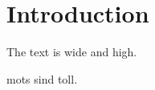 \chapter{Introduction}\label{ch:introduction}
The text is \the\textwidth {} wide and \the\textheight {} high.

\Glspl{mot} sind toll.
